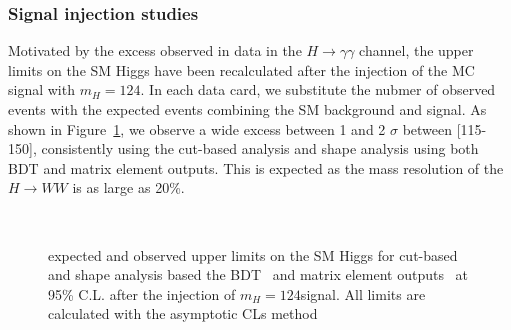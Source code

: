 \subsubsection{Signal injection studies}

Motivated by the excess observed in data in the $H\to\gamma\gamma$ channel, the upper limits on the SM Higgs have been 
recalculated after the injection of the MC signal with 
$m_H=124$\GeV. In each data card, we substitute the nubmer of 
observed events with the expected events combining the SM 
background and signal. As shown in Figure~\ref{fig:me_results_hww124_5fb}, 
we observe a wide excess between 1 and 2 $\sigma$ between [115-150]\GeV, consistently 
using the cut-based analysis and shape analysis using both BDT and 
matrix element outputs. This is expected as the mass resolution of the 
$H\to WW$ is as large as 20\%. 


\begin{figure}[!hbtp]
\centering
{} \\
\centering
{}
\caption{ expected and observed upper limits on the SM Higgs for cut-based~ and 
shape analysis based the BDT~ and matrix element outputs~ 
at 95\% C.L. after the injection of $m_H=124$\GeVcc signal. All limits are calculated with the 
asymptotic CLs method}
\label{fig:me_results_hww124_5fb}
\end{figure}
